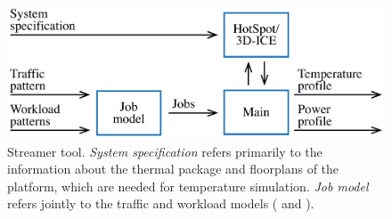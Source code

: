 \begin{figure}
  \centering
  \includegraphics[width=1.0\columnwidth]{include/assets/figures/streamer.pdf}
  \caption{
    Streamer tool. \emph{System specification} refers primarily to the
    information about the thermal package and floorplans of the platform, which
    are needed for temperature simulation. \emph{Job model} refers jointly to
    the traffic and workload models ( and ).
  }
\end{figure}
